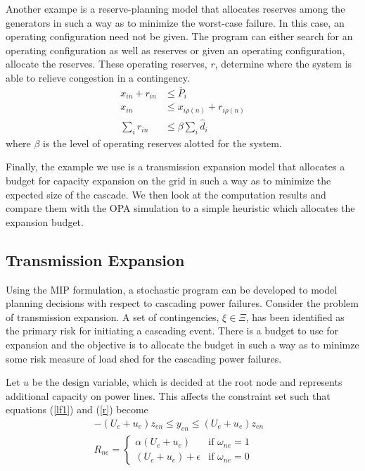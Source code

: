  Another exampe is a reserve-planning model that allocates reserves among the generators in such a way as to minimize the worst-case failure.
In this case, an operating configuration need not be given.  The program can either search for an operating configuration as well as reserves or given an operating configuration, allocate the reserves.  These operating reserves, $r$, determine where the system is able to relieve congestion in a contingency.
\begin{align}
x_{in} + r_{in} &\le \overline{P}_i \\
x_{in} &\le x_{i\rho (n)} + r_{i\rho (n)} \\
\sum_i r_{in} &\le \beta \sum_i \hat{d}_i 
\end{align}
where $\beta$ is the level of operating reserves alotted for the system.


Finally, the example we use is a transmission expansion model that allocates a budget for capacity expansion on the grid in such a way as to minimize the expected size of the cascade.  We then look at the computation results and compare them with the OPA simulation to a simple heuristic which allocates the expansion budget.




\subsection{Transmission Expansion}
Using the MIP formulation, a stochastic program can be developed to model planning decisions with respect to cascading power failures.  Consider the problem of transmission expansion.  A set of contingencies, $\xi \in \Xi$, has been identified as the primary risk for initiating a cascading event.  There is a budget to use for expansion and the objective is to allocate the budget in such a way as to minimze some risk measure of load shed for the cascading power failures.

Let $u$ be the design variable, which is decided at the root node and represents additional capacity on power lines.  This affects the constraint set such that equations (\ref{lf1}) and (\ref{r}) become  
\begin{align}
-(U_{e}+u_e) z_{en} \le y_{en} \le (U_{e}+u_e) z_{en} &	\label{lfm}	\\
 R_{ne} = 
 \left\{ 
	\begin{array}{lr}
				\alpha (U_e + u_e) & \mbox{if } \omega_{ne}=1\\
			  (U_e + u_e) + \epsilon & \mbox{if } \omega_{ne}=0
	\end{array}
 \right. \label{rm}
\end{align}



